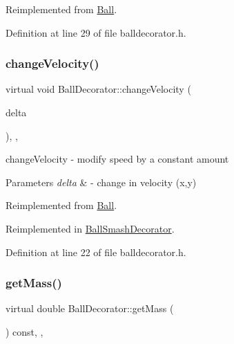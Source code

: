 Reimplemented from \mbox{\hyperlink{class_ball_a9df4c9fc8620d003cf9717d84e64d5ee}{Ball}}.



Definition at line 29 of file balldecorator.\+h.

\mbox{\label{class_ball_decorator_a3e4f4d31f6409f018b8b337bcf2bd284}} 
\subsubsection{\texorpdfstring{change\+Velocity()}{changeVelocity()}}
{\footnotesize\ttfamily virtual void Ball\+Decorator\+::change\+Velocity (\begin{DoxyParamCaption}\item[{const Q\+Vector2D \&}]{delta }\end{DoxyParamCaption})\hspace{0.3cm}{\ttfamily [inline]}, {\ttfamily [override]}, {\ttfamily [virtual]}}



change\+Velocity -\/ modify speed by a constant amount 


\begin{DoxyParams}{Parameters}
{\em delta} & -\/ change in velocity (x,y) \\
\hline
\end{DoxyParams}


Reimplemented from \mbox{\hyperlink{class_ball_add51f90f60cb862daa8f3f7aa743f933}{Ball}}.



Reimplemented in \mbox{\hyperlink{class_ball_smash_decorator_ad59848156e8eabad3e561a1d113f7029}{Ball\+Smash\+Decorator}}.



Definition at line 22 of file balldecorator.\+h.

\mbox{\label{class_ball_decorator_acf6892e513f9dc01bb6f87028e8ca9d5}} 
\subsubsection{\texorpdfstring{get\+Mass()}{getMass()}}
{\footnotesize\ttfamily virtual double Ball\+Decorator\+::get\+Mass (\begin{DoxyParamCaption}{ }\end{DoxyParamCaption}) const\hspace{0.3cm}{\ttfamily [inline]}, {\ttfamily [override]}, {\ttfamily [virtual]}}



